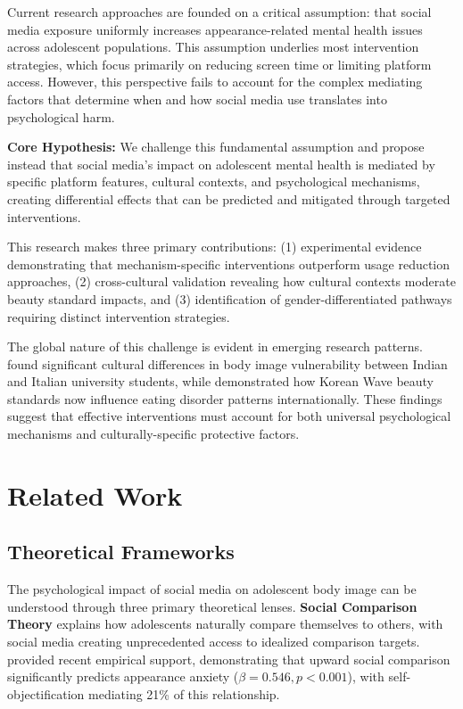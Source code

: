 \documentclass{article}
\begin{document}
Current research approaches are founded on a critical assumption: that social media exposure uniformly increases appearance-related mental health issues across adolescent populations. This assumption underlies most intervention strategies, which focus primarily on reducing screen time or limiting platform access. However, this perspective fails to account for the complex mediating factors that determine when and how social media use translates into psychological harm.

\textbf{Core Hypothesis:} We challenge this fundamental assumption and propose instead that social media's impact on adolescent mental health is mediated by specific platform features, cultural contexts, and psychological mechanisms, creating differential effects that can be predicted and mitigated through targeted interventions.

This research makes three primary contributions: (1) experimental evidence demonstrating that mechanism-specific interventions outperform usage reduction approaches, (2) cross-cultural validation revealing how cultural contexts moderate beauty standard impacts, and (3) identification of gender-differentiated pathways requiring distinct intervention strategies.

The global nature of this challenge is evident in emerging research patterns. \citet{abdoli2025} found significant cultural differences in body image vulnerability between Indian and Italian university students, while \citet{kumari2024} demonstrated how Korean Wave beauty standards now influence eating disorder patterns internationally. These findings suggest that effective interventions must account for both universal psychological mechanisms and culturally-specific protective factors.

\section{Related Work}

\subsection{Theoretical Frameworks}

The psychological impact of social media on adolescent body image can be understood through three primary theoretical lenses. \textbf{Social Comparison Theory} \citep{festinger1954} explains how adolescents naturally compare themselves to others, with social media creating unprecedented access to idealized comparison targets. \citet{tian2024} provided recent empirical support, demonstrating that upward social comparison significantly predicts appearance anxiety ($\beta = 0.546, p < 0.001$), with self-objectification mediating 21\% of this relationship.
\end{document}
